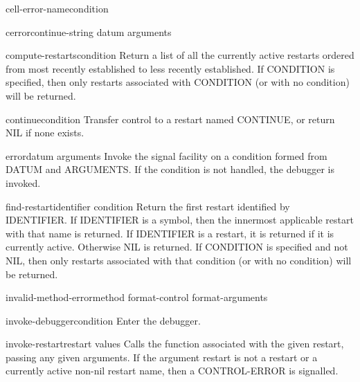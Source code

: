 \documentclass[10pt,english]{book}
\begin{document}
\begin{function}{cell-error-name}{condition}
  
\end{function}

\begin{function}{cerror}{continue-string datum \rest arguments}
  
\end{function}

\begin{function}{compute-restarts}{\op condition}
  Return a list of all the currently active restarts ordered from most recently
established to less recently established. If CONDITION is specified, then only
restarts associated with CONDITION (or with no condition) will be returned.
\end{function}

\begin{function}{continue}{\op condition}
  Transfer control to a restart named CONTINUE, or return NIL if none exists.
\end{function}

\begin{function}{error}{datum \rest arguments}
  Invoke the signal facility on a condition formed from DATUM and ARGUMENTS.
  If the condition is not handled, the debugger is invoked.
\end{function}

\begin{function}{find-restart}{identifier \op condition}
  Return the first restart identified by IDENTIFIER. If IDENTIFIER is a symbol,
then the innermost applicable restart with that name is returned. If IDENTIFIER
is a restart, it is returned if it is currently active. Otherwise NIL is
returned. If CONDITION is specified and not NIL, then only restarts associated
with that condition (or with no condition) will be returned.
\end{function}

\begin{function}{invalid-method-error}{method format-control \rest format-arguments}
  
\end{function}

\begin{function}{invoke-debugger}{condition}
  Enter the debugger.
\end{function}

\begin{function}{invoke-restart}{restart \rest values}
  Calls the function associated with the given restart, passing any given
   arguments. If the argument restart is not a restart or a currently active
   non-nil restart name, then a CONTROL-ERROR is signalled.
\end{function}
\end{document}
